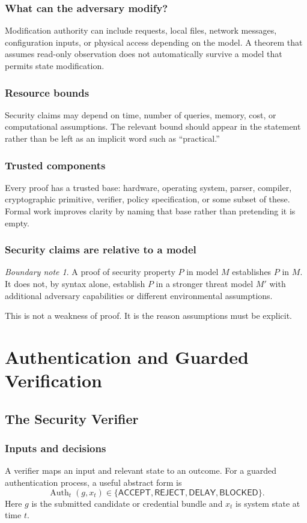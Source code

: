 \documentclass[11pt,oneside]{book}
\theoremstyle{definition}
\theoremstyle{remark}
\newtheorem{boundary}[theorem]{Boundary note}
\newcommand{\ACCEPT}{\mathsf{ACCEPT}}
\newcommand{\REJECT}{\mathsf{REJECT}}
\newcommand{\DELAY}{\mathsf{DELAY}}
\newcommand{\BLOCKED}{\mathsf{BLOCKED}}
\begin{document}
\section{What can the adversary modify?}
Modification authority can include requests, local files, network messages, configuration inputs, or physical access depending on the model. A theorem that assumes read-only observation does not automatically survive a model that permits state modification.

\section{Resource bounds}
Security claims may depend on time, number of queries, memory, cost, or computational assumptions. The relevant bound should appear in the statement rather than be left as an implicit word such as ``practical.''

\section{Trusted components}
Every proof has a trusted base: hardware, operating system, parser, compiler, cryptographic primitive, verifier, policy specification, or some subset of these. Formal work improves clarity by naming that base rather than pretending it is empty.

\section{Security claims are relative to a model}
\begin{boundary}
A proof of security property $P$ in model $M$ establishes $P$ in $M$. It does not, by syntax alone, establish $P$ in a stronger threat model $M'$ with additional adversary capabilities or different environmental assumptions.
\end{boundary}
This is not a weakness of proof. It is the reason assumptions must be explicit.

\part{Authentication and Guarded Verification}

\chapter{The Security Verifier}
\label{ch:verifier}
\section{Inputs and decisions}
A verifier maps an input and relevant state to an outcome. For a guarded authentication process, a useful abstract form is
\[
\operatorname{Auth}_t(g,x_t)\in\{\ACCEPT,\REJECT,\DELAY,\BLOCKED\}.
\]
Here $g$ is the submitted candidate or credential bundle and $x_t$ is system state at time $t$.
\end{document}

